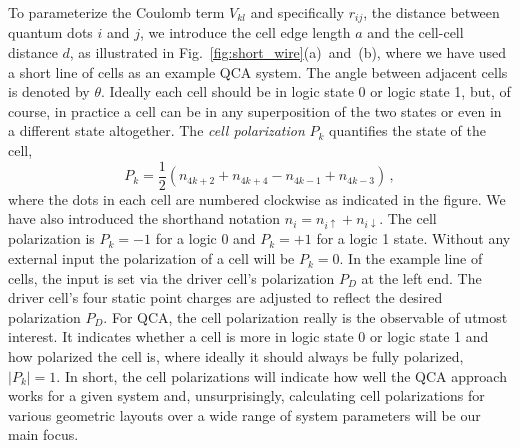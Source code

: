 To parameterize the Coulomb term $V_{kl}$ and specifically $r_{ij}$, the
distance between quantum dots $i$ and $j$, we introduce the cell edge length $a$
and the cell-cell distance $d$, as illustrated in
Fig.~\ref{fig:short_wire}(a)~and~(b), where we have used a short line of cells
as an example QCA system. The angle between adjacent cells is denoted by
$\theta$. Ideally each cell should be in logic state 0 or logic state 1, but,
of course, in practice a cell can be in any superposition of the two states or
even in a different state altogether. The \emph{cell polarization} $P_k$
quantifies the state of the cell,
\begin{equation}
  \label{eq:polarization}
  P_k = \frac{1}{2} \left( n_{4k+2} + n_{4k+4} - n_{4k-1} + n_{4k-3} \right) \, ,
\end{equation}
where the dots in each cell are numbered clockwise as indicated in the figure.
We have also introduced the shorthand notation $n_i = n_{i\uparrow} +
n_{i\downarrow}$. The cell polarization is $P_k = -1$ for a logic 0 and $P_k =
+1$ for a logic 1 state. Without any external input the polarization of a cell
will be $P_k = 0$. In the example line of cells, the input is set via the
driver cell's polarization $P_D$ at the left end. The driver cell's four static
point charges are adjusted to reflect the desired polarization $P_D$. For QCA,
the cell polarization really is the observable of utmost interest. It indicates
whether a cell is more in logic state 0 or logic state 1 and how polarized the
cell is, where ideally it should always be fully polarized, $|P_k| = 1$. In
short, the cell polarizations will indicate how well the QCA approach works for
a given system and, unsurprisingly, calculating cell polarizations for various
geometric layouts over a wide range of system parameters will be our main focus.

